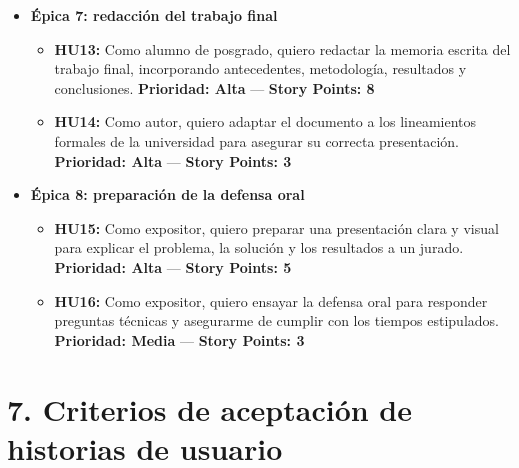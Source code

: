 \documentclass[
11pt, %
]{charter}
\begin{document}
\begin{itemize}
  \item \textbf{Épica 7: redacción del trabajo final}
    \begin{itemize}
      \item \textbf{HU13:} Como alumno de posgrado, quiero redactar la memoria escrita del trabajo final, incorporando antecedentes, metodología, resultados y conclusiones.  
      \newline \textbf{Prioridad: Alta} — \textbf{Story Points: 8}

      \item \textbf{HU14:} Como autor, quiero adaptar el documento a los lineamientos formales de la universidad para asegurar su correcta presentación.  
      \newline \textbf{Prioridad: Alta} — \textbf{Story Points: 3}
    \end{itemize}

  \item \textbf{Épica 8: preparación de la defensa oral}
    \begin{itemize}
      \item \textbf{HU15:} Como expositor, quiero preparar una presentación clara y visual para explicar el problema, la solución y los resultados a un jurado.  
      \newline \textbf{Prioridad: Alta} — \textbf{Story Points: 5}

      \item \textbf{HU16:} Como expositor, quiero ensayar la defensa oral para responder preguntas técnicas y asegurarme de cumplir con los tiempos estipulados.  
      \newline \textbf{Prioridad: Media} — \textbf{Story Points: 3}
    \end{itemize}
\end{itemize}

\section{7. Criterios de aceptación de historias de usuario}
\label{sec:criteriosAceptacion}
\end{document}
